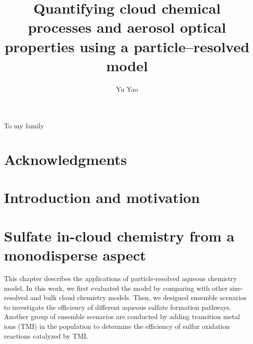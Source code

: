 \documentclass[edeposit,fullpage]{uiucthesis2009}
\begin{document}
\title{Quantifying cloud chemical processes and aerosol optical properties using a particle--resolved model}
\author{Yu Yao}
\phdthesis
{}
\maketitle


\frontmatter

\begin{abstract}

\end{abstract}

\begin{dedication}
To my family
\end{dedication}

\chapter*{Acknowledgments}


%


\tableofcontents

\mainmatter

\chapter{Introduction and motivation}
\chapter{Sulfate in-cloud chemistry from a monodisperse aspect}

This chapter describes the applications of particle-resolved aqueous chemistry model. In this work, we first evaluated the model by comparing with other size-resolved and bulk cloud chemistry models. Then, we designed ensemble scenarios to investigate the efficiency of different aqueous sulfate formation pathways. Another group of ensemble scenarios are conducted by adding transition metal ions (TMI) in the population to determine the efficiency of sulfur oxidation reactions catalyzed by TMI. 
\end{document}
